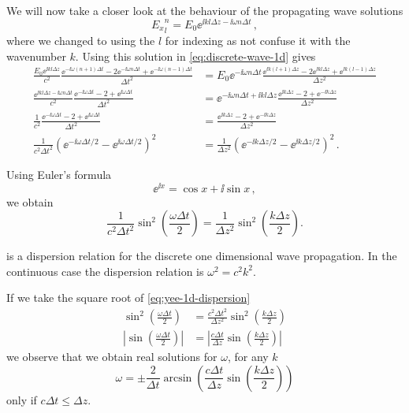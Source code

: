 \documentclass[12pt, class=report, crop=false]{standalone}
\begin{document}
We will now take a closer look at the behaviour of the propagating wave solutions
\[
{E_x}^n_l = E_0 \ee^{\ii k l \Delta z - \ii \omega n \Delta t}\,,
\]
where we changed to using the \(l\) for indexing as not confuse it with the
wavenumber \(k\). Using this solution in \cref{eq:discrete-wave-1d} gives
\[
\begin{aligned}
  \frac{E_0\ee^{\ii k l \Delta z}}{c^2}
  \frac{\ee^{-\ii \omega (n+1) \Delta t}
      -2\ee^{-\ii \omega n \Delta t}
      + \ee^{-\ii \omega (n-1) \Delta t}}{\Delta t^2} &=
  E_0\ee^{-\ii \omega n \Delta t}
  \frac{\ee^{\ii k (l+1) \Delta z}
      -2\ee^{\ii k l \Delta z}
      + \ee^{\ii k (l-1) \Delta z}}{\Delta z^2} \\
  \frac{\ee^{\ii k l \Delta z - \ii \omega n \Delta t}}{c^2}
  \frac{\ee^{-\ii \omega \Delta t}
      -2
      + \ee^{\ii \omega \Delta t}}{\Delta t^2} &=
  \ee^{-\ii \omega n \Delta t + \ii k l \Delta z}
  \frac{\ee^{\ii k \Delta z}
      -2
      + \ee^{-\ii k \Delta z}}{\Delta z^2} \\
  \frac{1}{c^2}
  \frac{\ee^{-\ii \omega \Delta t}
      -2
      + \ee^{\ii \omega \Delta t}}{\Delta t^2} &=
  \frac{\ee^{\ii k \Delta z}
      -2
      + \ee^{-\ii k \Delta z}}{\Delta z^2} \\
  \frac{1}{c^2 \Delta t^2}
  {\left(\ee^{-\ii \omega \Delta t / 2} - \ee^{\ii \omega \Delta t / 2}\right)}^2 &=
  \frac{1}{\Delta z^2}
  {\left(\ee^{-\ii k \Delta z / 2} - \ee^{\ii k \Delta z / 2}\right)}^2\,.
\end{aligned}
\]

Using Euler's formula
\[
\ee^{\ii x} = \cos{x} + \ii \sin{x}\,,
\]
we obtain
\begin{equation}
  \label{eq:yee-1d-dispersion}
  \frac{1}{c^2 \Delta t^2} \sin^2\left(\frac{\omega \Delta t}{2}\right) =
  \frac{1}{\Delta z^2} \sin^2\left(\frac{k \Delta z}{2}\right).
\end{equation}

 is a dispersion relation for the discrete one dimensional
wave propagation. In the continuous case the dispersion relation is \(\omega^2 = c^2 k^2\).

If we take the square root of \cref{eq:yee-1d-dispersion}
\[
\begin{aligned}
  \sin^2\left(\frac{\omega \Delta t}{2}\right) &=
  \frac{c^2 \Delta t^2}{\Delta z^2} \sin^2\left(\frac{k \Delta z}{2}\right) \\
  \left|\sin\left(\frac{\omega \Delta t}{2}\right)\right| &=
  \left|\frac{c \Delta t}{\Delta z} \sin\left(\frac{k \Delta z}{2}\right)\right|
\end{aligned}
\]
we observe that we obtain real solutions for \(\omega\), for any \(k\)
\[
\omega = \pm \frac{2}{\Delta t} \arcsin(\frac{c \Delta t}{\Delta z} \sin(\frac{k \Delta z}{2}))
\]
only if \(c \Delta t \leq \Delta z\).
\end{document}
